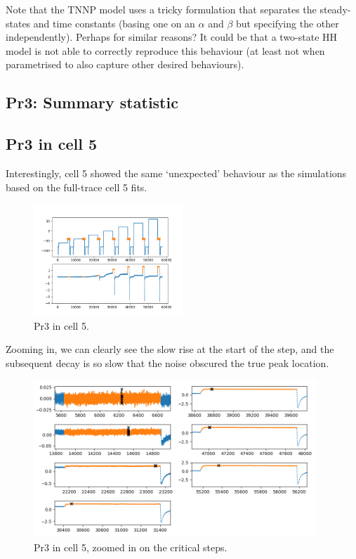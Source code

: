 \documentclass[preprint,authoryear,10pt]{elsarticle}
\begin{document}
Note that the TNNP model uses a tricky formulation that separates the
steady-states and time constants (basing one on an $\alpha$ and $\beta$ but
specifying the other independently).
Perhaps for similar reasons?
It could be that a two-state HH model is not able to correctly reproduce this
behaviour (at least not when parametrised to also capture other desired
behaviours).

%
%
\subsection{Pr3: Summary statistic}

%
%
\subsection{Pr3 in cell 5}

Interestingly, cell 5 showed the same `unexpected' behaviour as the simulations
based on the full-trace cell 5 fits.

\begin{figure}[H]
\centerline{
\includegraphics[width=0.5\textwidth]{fig/pr3-cell-5}
}
\caption{%
Pr3 in cell 5.
}
\label{fig:analysis-pr3-cell-5}
\end{figure}

Zooming in, we can clearly see the slow rise at the start of the step, and the
subsequent decay is so slow that the noise obscured the true peak location.

\begin{figure}[H]
\centerline{
\includegraphics[width=0.95\textwidth]{fig/pr3-cell-5-zoom}
}
\caption{%
Pr3 in cell 5, zoomed in on the critical steps.
}
\label{fig:analysis-pr3-cell-5-zoom}
\end{figure}
\end{document}
